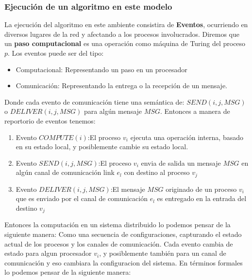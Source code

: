 \documentclass[10pt]{report}
\begin{document}
    \subsubsection{Ejecución de un algoritmo en este modelo}
    La ejecución del algoritmo en este ambiente consistira de \textbf{Eventos}, ocurriendo en diversos
    lugares de la red y afectando a los procesos involucrados.
    Diremos que un \textbf{paso computacional} es una operación como máquina de Turing del proceso $p$.
    Los eventos puede ser del tipo:
    \begin{itemize}
        \item Computacional: Representando un paso en un procesador
        \item Comunicación: Representando la entrega o la recepción de un mensaje.
    \end{itemize}
    Donde cada evento de comunicación tiene una semántica de:\newline
    $SEND(i,j,MSG)$ o $DELIVER(i,j,MSG)$ para algún mensaje $MSG$.
    Entonces a manera de reportorio de eventos tenemos:
    \begin{enumerate}
        \item Evento $COMPUTE(i)$:\space El proceso $v_{i}$ ejecuta una operación interna, basado en su estado local, y
        posiblemente cambie su estado local.
        \item Evento $SEND(i,j,MSG)$:\space El proceso $v_{i}$ envia de salida un mensaje $MSG$ en algún canal de
        comunicación link $e_{l}$ con destino al proceso $v_{j}$
        \item Evento $DELIVER(i,j,MSG)$:\space El mensaje $MSG $ originado de un proceso $v_{i}$
        que es enviado por el canal de comunicación $e_{l}$ es entregado en la entrada del destino $v_{j}$
    \end{enumerate}
    Entonces la computación en un sistema distribuido lo podemos pensar de la siguiente manera: \newline
    Como una secuencia de configuraciones, capturando el estado actual de los procesos y los canales de comunicación.\newline
    Cada evento cambia de estado para algun procesador $v_{i}$, y posiblemente también para un canal de comunicación
    y eso cambiara la configuracion del sistema.
    En términos formales lo podemos pensar de la siguiente manera:
    \theoremstyle{definition}
\end{document}
